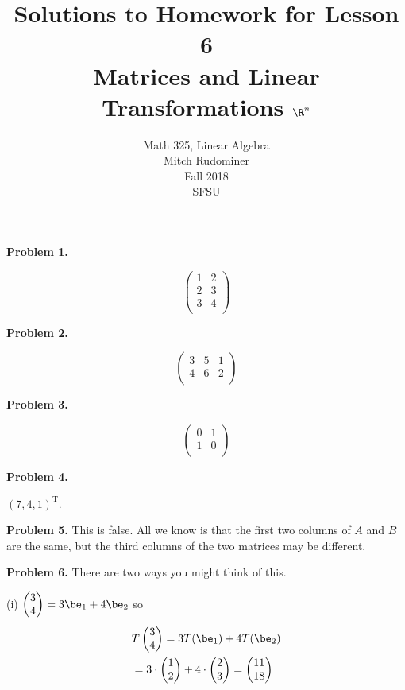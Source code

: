 \documentclass[oneside,12pt]{amsart}
\begin{document}
\title{Solutions to Homework for Lesson 6 \\ Matrices and Linear Transformations $\R^n$}
\author{Math 325, Linear Algebra \\ Mitch Rudominer \\ Fall 2018 \\ SFSU }
\date{}

\maketitle

\textbf{Problem 1.}

$$
\begin{pmatrix}
1 & 2 \\
2 & 3 \\
3 & 4 \\
\end{pmatrix}
$$

\medskip

\textbf{Problem 2.}


$$
\begin{pmatrix}
3 & 5 & 1 \\
4 & 6 & 2 \\
\end{pmatrix}
$$

\medskip

\textbf{Problem 3.}

$$
\begin{pmatrix}
0 & 1 \\
1 & 0 \\
\end{pmatrix}
$$

\medskip

\textbf{Problem 4.}

$(7, 4, 1)^{\text{T}}$.

\medskip

\textbf{Problem 5.} This is false. All we know is that the first
two columns of $A$ and $B$ are the same, but the third columns of
the two matrices may be different.

\medskip


\textbf{Problem 6.} There are two ways you might think of this.

\smallskip

(i) $\begin{pmatrix} 3 \\ 4\end{pmatrix} = 3 \be_1 + 4 \be_2$
so
\begin{align*}
&T\begin{pmatrix} 3 \\ 4\end{pmatrix} = 3 T(\be_1) + 4 T(\be_2) \\
&= 3\cdot \begin{pmatrix} 1 \\ 2\end{pmatrix} + 4 \cdot \begin{pmatrix} 2 \\ 3\end{pmatrix}
=\begin{pmatrix} 11 \\ 18\end{pmatrix}
\end{align*}
\end{document}
